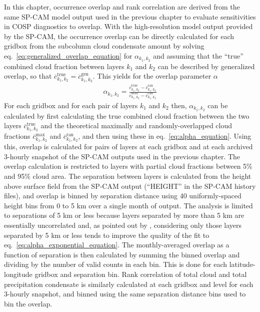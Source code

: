 In this chapter, occurrence overlap and rank correlation are derived
from the same SP-CAM model output used in the previous chapter to
evaluate sensitivities in COSP diagnostics to overlap. With the
high-resolution model output provided by the SP-CAM, the occurrence
overlap can be directly calculated for each gridbox from the subcolumn
cloud condensate amount by solving
eq.~\ref{eq:generalized_overlap_equation} for \(\alpha_{k_1, k_2}\) and
assuming that the ``true'' combined cloud fraction between layers
\(k_1\) and \(k_2\) can be described by generalized overlap, so that
\(\overline{c}^\textrm{true}_{k_1, k_2} = \overline{c}^\textrm{gen}_{k_1, k_2}\).
This yields for the overlap parameter \(\alpha\)
\begin{equation}\begin{gathered} \alpha_{k_1, k_2} = \frac{
\overline{c}^\textrm{true}_{k_1, k_2} - \overline{c}^\textrm{ran}_{k_1, k_2} }{
\overline{c}^\textrm{max}_{k_1, k_2} - \overline{c}^\textrm{ran}_{k_1, k_2} }
\end{gathered}\label{eq:alpha_equation}\end{equation} For each gridbox
and for each pair of layers \(k_1\) and \(k_2\) then,
\(\alpha_{k_1, k_2}\) can be calculated by first calculating the true
combined cloud fraction between the two layers
\(\overline{c}^\textrm{true}_{k_1, k_2}\) and the theoretical maximally
and randomly-overlapped cloud fractions
\(\overline{c}^\textrm{max}_{k_1, k_2}\) and
\(\overline{c}^\textrm{ran}_{k_1, k_2}\), and then using these in
eq.~\ref{eq:alpha_equation}. Using this, overlap is calculated for pairs
of layers at each gridbox and at each archived 3-hourly snapshot of the
SP-CAM outputs used in the previous chapter. The overlap calculation is
restricted to layers with partial cloud fractions between 5\% and 95\%
cloud area. The separation between layers is calculated from the height
above surface field from the SP-CAM output (``HEIGHT'' in the SP-CAM
history files), and overlap is binned by separation distance using 40
uniformly-spaced height bins from 0 to 5 km over a single month of
output. The analysis is limited to separations of 5 km or less because
layers separated by more than 5 km are essentially uncorrelated and, as
pointed out by \citet{pincus_et_al_2005}, considering only those layers
separated by 5 km or less tends to improve the quality of the fit to
eq.~\ref{eq:alpha_exponential_equation}. The monthly-averaged overlap as
a function of separation is then calculated by summing the binned
overlap and dividing by the number of valid counts in each bin. This is
done for each latitude-longitude gridbox and separation bin. Rank
correlation of total cloud and total precipitation condensate is
similarly calculated at each gridbox and level for each 3-hourly
snapshot, and binned using the same separation distance bins used to bin
the overlap.

